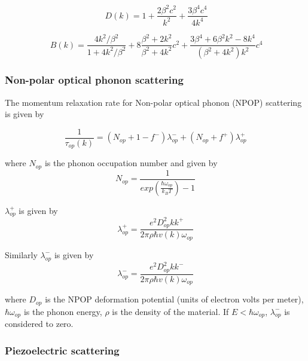 \documentclass[12pt]{article}
\begin{document}
\begin{equation}
\ D(k) = 1 + \frac{2 \beta^2 c^2}{k^2} + \frac{3 \beta^4 c^4}{4 k^4}
\label{D(k)}
\end{equation} 

\begin{equation}
\ B(k) = \frac{4 k^2/\beta^2}{1 + 4 k^2/\beta^2} + 8 \frac{\beta^2+2k^2}{\beta^2+4k^2}c^2 +   \frac{3\beta^4+6\beta^2 k^2 -8k^4}{(\beta^2+4k^2)k^2}c^4
\label{B(k)}
\end{equation} 

\subsubsection{Non-polar optical phonon scattering}
The momentum relaxation rate for Non-polar optical phonon (NPOP) scattering is given by \cite{rode3}

\begin{equation}
\frac{1}{\tau_{op}(k)} = (N_{op} + 1 - f^-) \lambda_{op}^- + (N_{op} + f^+) \lambda_{op}^+ 
\label{npop_n}
\end{equation}

where $N_{op}$ is the phonon occupation number and given by
\begin{equation}
N_{op} = \frac{1}{exp(\frac{\hbar \omega_{op}}{k_B T})-1} 
\label{N_op}
\end{equation}  

$\lambda_{op}^+$ is given by
\begin{equation}
\lambda_{op}^+ = \frac{e^2D_{op}^2kk^+}{2 \pi \rho \hbar v(k) \omega_{op}} 
\label{lambda_op_pos}
\end{equation}  

Similarly $\lambda_{op}^-$ is given by
\begin{equation}
\lambda_{op}^- = \frac{e^2D_{op}^2 kk^-}{2 \pi \rho \hbar v(k) \omega_{op}} 
\label{lambda_op_neg}
\end{equation}  

where $D_{op}$ is the NPOP deformation potential (units of electron volts per meter), $\hbar \omega_{op}$ is the phonon energy, $\rho$ is the density of the material. If $E < \hbar \omega_{op}$,  $\lambda_{op}^-$ is considered to zero.\\ 


\subsubsection{Piezoelectric scattering}
\end{document}
